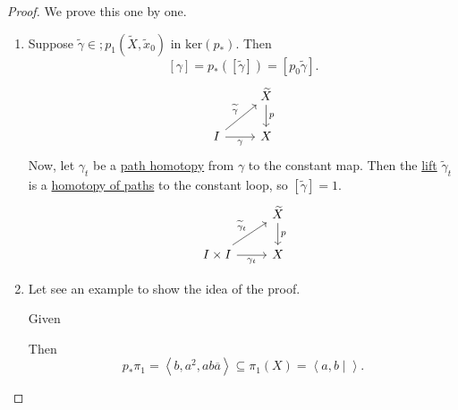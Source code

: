 \begin{proof}
	We prove this one by one.
	\begin{enumerate}
		\item Suppose \(\widetilde{\gamma} \in;p_1(\widetilde{X} , \widetilde{x} _0)\) in \(\mathrm{ker}(p_*) \). Then
		      \[
			      [\gamma] =p_*([\widetilde{\gamma} ]) = \left[p_{0} \widetilde{\gamma} \right].
		      \]
		      \[
			      \begin{tikzcd}
				      & {\widetilde{X}} \\
				      I & X
				      \arrow["{\widetilde{\gamma}}", from=2-1, to=1-2]
				      \arrow["p", from=1-2, to=2-2]
				      \arrow["\gamma"', from=2-1, to=2-2]
			      \end{tikzcd}
		      \]
		      Now, let \(\gamma _t\) be a \hyperref[def:homotopy-path]{path homotopy} from \(\gamma \) to the constant map.
		      Then the \hyperref[prop:homotopy-lifting-property]{lift} \(\widetilde{\gamma} _{t}\) is a \hyperref[def:homotopy-path]{homotopy of paths}
		      to the constant loop, so \([\widetilde{\gamma} ] = 1\).
		      \[
			      \begin{tikzcd}
				      & {\widetilde{X}} \\
				      {I\times I} & X
				      \arrow["{\widetilde{\gamma}_t}", from=2-1, to=1-2]
				      \arrow["p", from=1-2, to=2-2]
				      \arrow["{\gamma_t}"', from=2-1, to=2-2]
			      \end{tikzcd}
		      \]
		\item Let see an example to show the idea of the proof.
		      \begin{eg}
			      Given
			      \begin{figure}[H]
				      \centering
				      \label{fig:eg:lec14:2}
			      \end{figure}
		      \end{eg}
		      Then
		      \[
			      p_*\pi _1 = \left< b, a^{2} , ab \overline{a}  \right> \subseteq \pi _1(X) = \left< a, b \mid  \right>.
		      \]
	\end{enumerate}
\end{proof}
